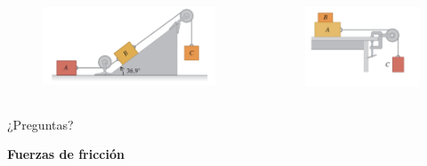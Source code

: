 \begin{frame}
\begin{columns}
    \begin{figure}
        \centering
        \includegraphics[width=1\linewidth]{figures/poleas-y-cajas1.jpg}
    \end{figure}

    \begin{figure}
        \centering
        \includegraphics[width=1\linewidth]{figures/cajas2.jpg}
    \end{figure}
\end{columns}
    
\end{frame}

\begin{frame}
    \begin{center}
        \Huge ¿Preguntas?
    \end{center}
\end{frame}

\begin{frame}
    \begin{center}
        \LARGE \textbf{Fuerzas de fricción}
    \end{center}
\end{frame}

